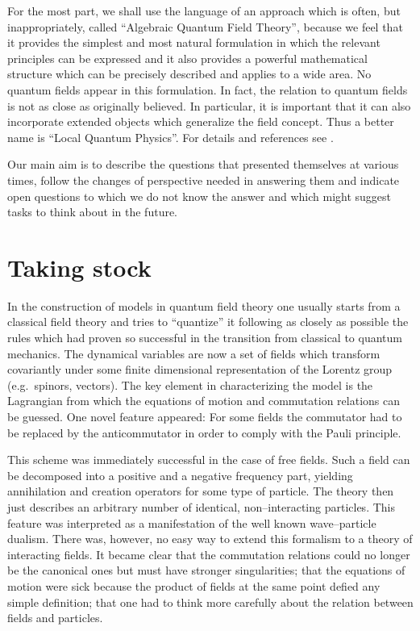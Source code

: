 For the most part, we shall use the language of an approach 
which is often, but inappropriately, called ``Algebraic
Quantum Field Theory'', because we feel that it provides the 
simplest and most natural formulation in which the relevant 
principles can be expressed and it also provides a powerful
mathematical structure which can be precisely described 
and applies to a wide area.
No quantum fields appear in this formulation. 
In fact, the relation to quantum fields is not as close as originally believed.
In particular, it is important that 
it can also incorporate extended objects which generalize the 
field concept. Thus a better name is ``Local Quantum Physics''.
For details and references see \cite{Ha}. 

Our main aim is to describe the questions that presented themselves
at various times, follow the changes of perspective needed in 
answering them and indicate open questions to which we do not know 
the answer and which might suggest tasks to think about in the 
future.  
\section{Taking stock}
\setcounter{equation}{0}
In the construction of models in quantum field theory one usually
starts from a classical field theory and tries to ``quantize'' it
following as closely as possible the rules which had proven so
successful in the transition from classical to quantum
mechanics. The
dynamical variables are now a set of fields which transform
covariantly under some finite dimensional representation of the Lorentz
group (e.g.\ spinors, vectors). The key element in characterizing the
model is the Lagrangian from which the equations of motion and
commutation relations can be guessed. One novel feature appeared: For
some fields the commutator had to be replaced by the anticommutator 
in order to comply with the Pauli principle. 

This scheme was
immediately successful in the case of free fields. Such a field can be
decomposed into a positive and a negative frequency part, yielding
annihilation and creation operators for some type of particle. The
theory then just describes an arbitrary number of identical, non--interacting
particles. This feature was interpreted as a manifestation of the well
known wave--particle dualism. There was, however, no easy way to extend
this formalism to a theory of interacting fields. It became clear that
the commutation relations could no longer be the canonical ones but
must have stronger singularities; that the equations of motion were
sick because the product of fields at the same point defied any
simple definition; that one had to think more carefully about the 
relation between fields and particles. 

